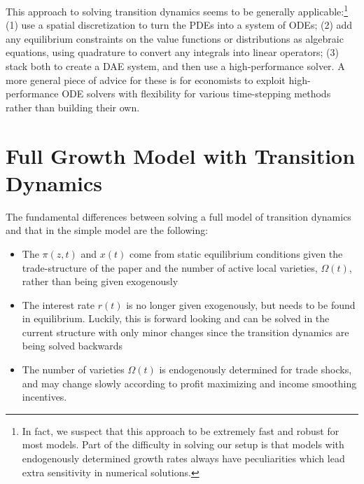 \documentclass[11pt]{article}
\begin{document}
This approach to solving transition dynamics seems to be generally applicable:\footnote{In fact, we suspect that this approach to be extremely fast and robust for most models.  Part of the difficulty in solving our setup is that models with endogenously determined growth rates always have peculiarities which lead extra sensitivity in numerical solutions.} (1) use a spatial discretization to turn the PDEs into a system of ODEs; (2) add any equilibrium constraints on the value functions or distributions as algebraic equations, using quadrature to convert any integrals into linear operators; (3) stack both to create a DAE system, and then use a high-performance solver.  A more general piece of advice for these is for economists to exploit high-performance ODE solvers with flexibility for various time-stepping methods rather than building their own.

\section{Full Growth Model with Transition Dynamics}
The fundamental differences between solving a full model of transition dynamics and that in the simple model are the following:
\begin{itemize}
	\item The $\pi(z,t)$ and $x(t)$ come from static equilibrium conditions given the trade-structure of the paper and the number of active local varieties, $\Omega(t)$, rather than being given exogenously
	\item The interest rate $r(t)$ is no longer given exogenously, but needs to be found in equilibrium.  Luckily, this is forward looking and can be solved in the current structure with only minor changes since the transition dynamics are being solved backwards
	\item The number of varieties $\Omega(t)$ is endogenously determined for trade shocks, and may change slowly according to profit maximizing and income smoothing incentives.
\end{itemize}
\end{document}
